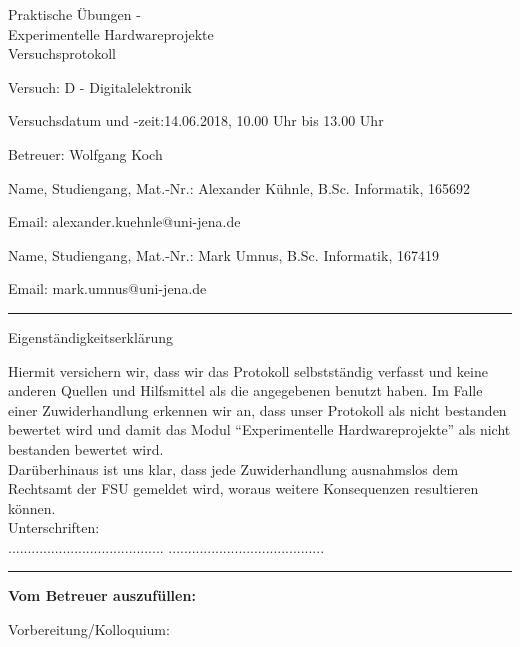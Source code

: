 \documentclass[12pt,a4paper]{scrartcl}
\begin{document}
\thispagestyle{empty}

\begin{center}
  \LARGE
  Praktische \"Ubungen - \\
  Experimentelle Hardwareprojekte \\
  \bigskip
  \Large
  Versuchsprotokoll
\end{center}

\vspace{1em}
Versuch: D - Digitalelektronik

Versuchsdatum und -zeit:14.06.2018, 10.00 Uhr bis 13.00 Uhr

Betreuer: Wolfgang Koch

\vspace{1em}
Name, Studiengang, Mat.-Nr.: Alexander K\"uhnle, B.Sc. Informatik, 165692

Email: alexander.kuehnle@uni-jena.de

\vspace{1em}
Name, Studiengang, Mat.-Nr.: Mark Umnus, B.Sc. Informatik, 167419

Email: mark.umnus@uni-jena.de

\vspace*{1cm}
\hrule
\vspace*{1cm}
{\Large  Eigenst\"andigkeitserkl\"arung }

Hiermit versichern wir, dass wir das Protokoll selbstst\"andig verfasst
und keine anderen Quellen und Hilfsmittel als die angegebenen benutzt
haben. Im Falle einer Zuwiderhandlung erkennen wir an, dass unser Protokoll
als nicht bestanden bewertet wird und damit das Modul ``Experimentelle
Hardwareprojekte'' als nicht bestanden bewertet wird. \\
Dar\"uberhinaus ist uns klar, dass jede Zuwiderhandlung ausnahmslos dem
Rechtsamt der FSU gemeldet wird, woraus weitere Konsequenzen resultieren
k\"onnen. \\

Unterschriften: \\
\hspace*{4cm} ........................................
\hspace{2cm} ........................................  \\

\hrule

\vspace*{0.3cm}
\textbf{Vom Betreuer auszuf\"ullen:}

Vorbereitung/Kolloquium:
\end{document}
